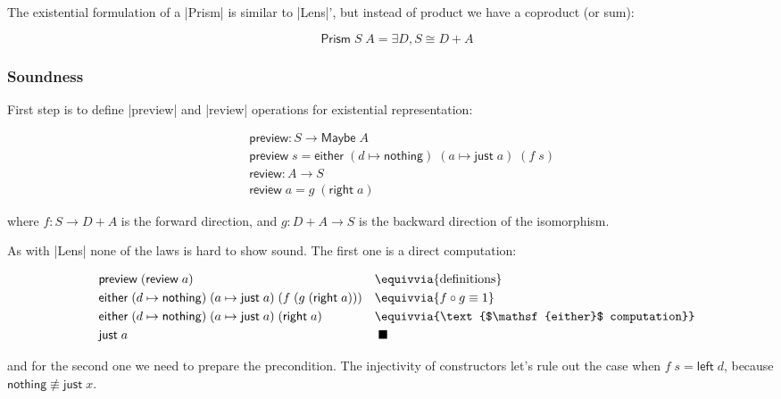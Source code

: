 \documentclass{article}
\begin{document}
The existential formulation of a |Prism| is similar to |Lens|',
but instead of product we have a coproduct (or sum):

\begin{equation}
\quad \mathsf{Prism}\;S\;A = \exists D, S \cong D + A
\end{equation}

\subsubsection{Soundness}

First step is to define |preview| and |review| operations for existential representation:

\begin{equation}
\begin{aligned}
\quad &\mathsf{preview} : S \to \mathsf{Maybe}\;A \\
      &\mathsf{preview}\;s   = \mathsf{either}\;(d \mapsto \mathsf{nothing})\;(a \mapsto \mathsf{just}\;a) \; (f\;s) \\
      &\mathsf{review} : A \to S \\
      &\mathsf{review}\;a = g\; (\mathsf{right}\;a)
\end{aligned}
\end{equation}

where $f : S \to D + A$ is the forward direction, and $g : D + A \to S $ is the backward direction of the isomorphism.

As with |Lens| none of the laws is hard to show sound.
The first one is a direct computation:

\begin{equation}
\begin{aligned}
\quad &\mathsf{preview}\; (\mathsf{review}\; a)                               &&\equivvia{\text{definitions}} \\
      &\mathsf{either}\;(d \mapsto \mathsf{nothing})\;(a \mapsto \mathsf{just}\;a)\; (f\; (g\;(\mathsf{right}\; a)))  &&\equivvia{ f\circ g \equiv 1 } \\
      &\mathsf{either}\;(d \mapsto \mathsf{nothing})\;(a \mapsto \mathsf{just}\;a)\; (\mathsf{right}\; a)  &&\equivvia{\text{$\mathsf{either}$ computation}} \\
      &\mathsf{just}\;a  &&\;\blacksquare \\
\end{aligned}
\end{equation}

and for the second one we need to prepare the precondition.
The injectivity of constructors let's rule out the case when $f\;s = \mathsf{left}\;d$,
because $\mathsf{nothing} \not\equiv \mathsf{just}\;x$.
\end{document}
